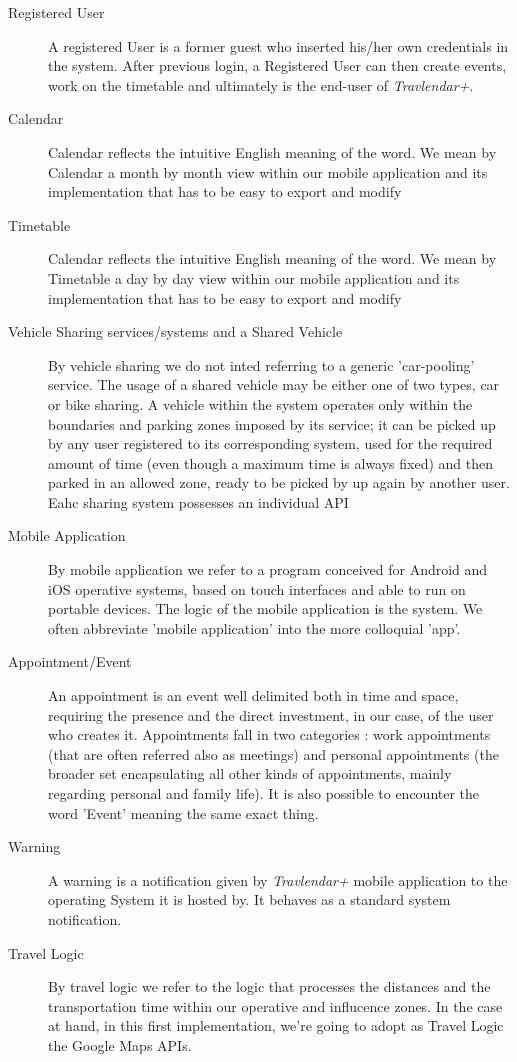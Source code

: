\begin{description}
				\item[Registered User] A registered User is a former guest who inserted his/her own credentials in the system. After previous login, a Registered User can then create events, work on the timetable and ultimately is the end-user of \textit{Travlendar+}.
				\item[Calendar] Calendar reflects the intuitive English meaning of the word. We mean by Calendar a month by month view within our mobile application and its implementation that has to be easy to export and modify
			       	\item[Timetable] Calendar reflects the intuitive English meaning of the word. We mean by Timetable a day by day view within our mobile application and its implementation that has to be easy to export and modify
				\item[Vehicle Sharing services/systems and a Shared Vehicle] By vehicle sharing we do not inted referring to a generic 'car-pooling' service. The usage of a shared vehicle may be either one of two types, car or bike sharing. A vehicle within the system operates only within the boundaries and parking zones imposed by its service; it can be picked up by any user registered to its corresponding system, used for the required amount of time (even though a maximum time is always fixed) and then parked in an allowed zone, ready to be picked by up again by another user. Eahc sharing system possesses an individual API			
				\item[Mobile Application] By mobile application we refer to a program conceived for Android and iOS operative systems, based on touch interfaces and able to run on portable devices. The logic of the mobile application is the system. We often abbreviate 'mobile application' into the more colloquial 'app'.
				\item[Appointment/Event] An appointment is an event well delimited both in time and space, requiring the presence and the direct investment, in our case, of the user who creates it. Appointments fall in two categories : work appointments (that are often referred also as meetings) and personal appointments (the broader set encapsulating all other kinds of appointments, mainly regarding personal and family life). It is also possible to encounter the word 'Event' meaning the same exact thing.
				\item[Warning] A warning is a notification given by \textit{Travlendar+} mobile application to the operating System it is hosted by. It behaves as a standard system notification.
				\item[Travel Logic] By travel logic we refer to the logic that processes the distances and the transportation time within our operative and influcence zones. In the case at hand, in this first implementation, we're going to adopt as Travel Logic the Google Maps APIs.

\end{description}
